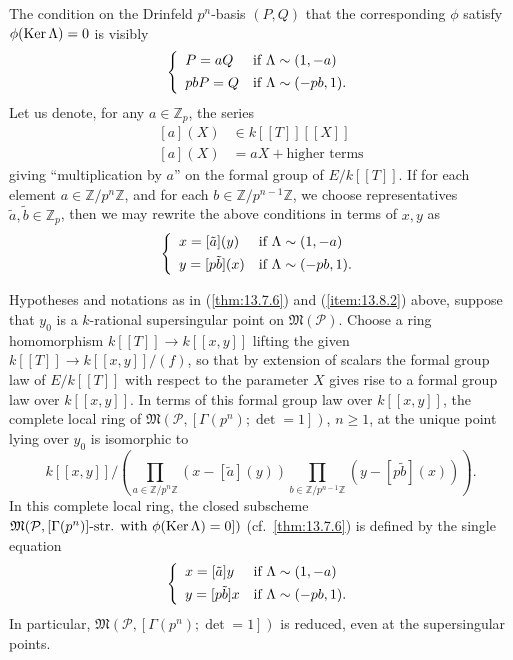 \kmitem\label{item:13.8.3}The condition on the Drinfeld $p^n$-basis $(P,Q)$ that the corresponding $\phi$ satisfy $\phi(\operatorname{Ker} \Lambda) = 0$ is visibly
\begin{equation}\label{eq:13.8.3.1}
\left\{\begin{array}{l@{\quad}l}
P = aQ & \text{if } \Lambda \sim (1, -a) \\[4pt]
pbP = Q & \text{if } \Lambda \sim (-pb, 1) .
\end{array}\right.
\end{equation}
Let us denote, for any $a \in \mathbb{Z}_p$, the series
\begin{equation}\label{eq:13.8.3.2}
\begin{aligned}
{}[a](X) &\in k[[T]][[X]] \\
{}[a](X) &= aX + \text{higher terms}
\end{aligned}
\end{equation}
giving ``multiplication by $a$'' on the formal group of $E/k[[T]]$. If for each element $a \in \mathbb{Z}/p^n\mathbb{Z}$, and for each $b \in \mathbb{Z}/p^{n-1}\mathbb{Z}$, we choose representatives $\tilde a, \tilde b \in \mathbb{Z}_p$, then we may rewrite the above conditions in terms of $x, y$ as
\begin{equation}\label{eq:13.8.3.3}
\left\{\begin{array}{l@{\quad}l}
x = [\tilde a](y) & \text{if } \Lambda \sim (1, -a) \\[4pt]
y = [p\tilde b](x) & \text{if } \Lambda \sim (-pb, 1) .
\end{array}\right.
\end{equation}

\begin{kthm}\label{thm:13.8.4}
Hypotheses and notations as in (\ref{thm:13.7.6}) and (\ref{item:13.8.2}) above, suppose that $y_0$ is a $k$-rational supersingular point on $\mathfrak{M}(\mathcal{P})$. Choose a ring homomorphism $k[[T]] \to k[[x,y]]$ lifting the given $k[[T]] \to k[[x,y]]/(f)$, so that by extension of scalars the formal group law of $E/k[[T]]$ with respect to the parameter $X$ gives rise to a formal group law over $k[[x,y]]$. In terms of this formal group law over $k[[x,y]]$, the complete local ring of $\mathfrak{M}(\mathcal{P}, [\Gamma(p^n); \det = 1])$, $n \ge 1$, at the unique point lying over $y_0$ is isomorphic to
\[
k[[x,y]]\Big/\left( \prod_{a \in \mathbb{Z}/p^n\mathbb{Z}} (x - [\tilde a](y)) \prod_{b \in \mathbb{Z}/p^{n-1}\mathbb{Z}} (y - [p\tilde b](x)) \right) .
\]
In this complete local ring, the closed subscheme $\mathfrak{M}(\mathcal{P},\allowbreak[\Gamma(p^n)]\allowbreak\text{-str. with }\phi(\operatorname{Ker} \Lambda) = 0])$ (cf.\ \ref{thm:13.7.6}) is defined by the single equation
\[
\left\{\begin{array}{l@{\quad}l}
x = [\tilde a]y & \text{if } \Lambda \sim (1, -a) \\[4pt]
y = [p\tilde b]x & \text{if } \Lambda \sim (-pb, 1) .
\end{array}\right.
\]
In particular, $\mathfrak{M}(\mathcal{P}, [\Gamma(p^n); \det = 1])$ is reduced, even at the supersingular points.
\end{kthm}

